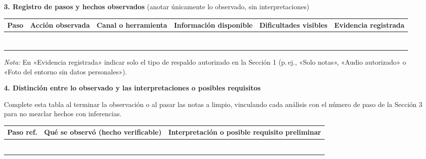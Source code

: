 \documentclass[11pt,a4paper]{article}
\renewcommand{\arraystretch}{1.4}
\begin{document}
\newpage
\textbf{3. Registro de pasos y hechos observados} {\small (anotar \'unicamente lo observado, sin interpretaciones)}

\vspace{3pt}
{\footnotesize
\setlength{\tabcolsep}{4pt}
\renewcommand{\arraystretch}{1.25}
\begin{tabularx}{\textwidth}{|C{0.9cm}|>{\hsize}Y|L{2.3cm}|>{\hsize}Y|>{\hsize}Y|>{\hsize}Y|}
\hline
\textbf{Paso} & \textbf{Acci\'on observada} & \textbf{Canal o herramienta} & \textbf{Informaci\'on disponible} & \textbf{Dificultades visibles} & \textbf{Evidencia registrada} \\
\hline
 & & & & & \\[2.35cm] \hline
 & & & & & \\[2.35cm] \hline
 & & & & & \\[2.35cm] \hline
 & & & & & \\[2.35cm] \hline
 & & & & & \\[2.35cm] \hline
 & & & & & \\[2.35cm] \hline
 & & & & & \\[2.35cm] \hline
\end{tabularx}
}

\vspace{4pt}
{\footnotesize\textit{Nota:} En «Evidencia registrada» indicar solo el tipo de respaldo autorizado en la Secci\'on 1 (p.\,ej., «Solo notas», «Audio autorizado» o «Foto del entorno sin datos personales»).\par}

\newpage
\textbf{4. Distinci\'on entre lo observado y las interpretaciones o posibles requisitos}

{\small Complete esta tabla al terminar la observaci\'on o al pasar las notas a limpio, vinculando cada an\'alisis con el n\'umero de paso de la Secci\'on 3 para no mezclar hechos con inferencias.}

\vspace{3pt}
{\footnotesize
\setlength{\tabcolsep}{5pt}
\renewcommand{\arraystretch}{1.25}
\begin{tabularx}{\textwidth}{|C{1.4cm}|Y|Y|}
\hline
\textbf{Paso ref.} & \textbf{Qu\'e se observ\'o (hecho verificable)} & \textbf{Interpretaci\'on o posible requisito preliminar} \\
\hline
 & & \\[2.25cm] \hline
 & & \\[2.25cm] \hline
 & & \\[2.25cm] \hline
 & & \\[2.25cm] \hline
 & & \\[2.25cm] \hline
 & & \\[2.25cm] \hline
\end{tabularx}
}
\end{document}
